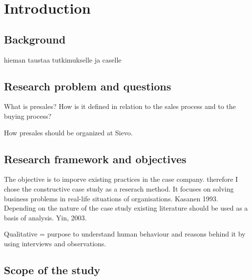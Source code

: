 \documentclass[12pt,a4paper,oneside,pdftex]{report}
\begin{document}
\pagestyle{headings}


% 

\chapter{Introduction}
\label{chapter:intro}






\section{Background}

hieman taustaa tutkimukselle ja caselle

\section{Research problem and questions}
\label{section:constructive}

What is presales? How is it defined in relation to the sales process and to the buying process?

How presales should be organized at Sievo. 

\section{Research framework and objectives}
\label{section:structure}

The objective is to imporve existing practices in the case company. therefore I chose the constructive case study as a reserach method. It focuses on solving business problems in real-life situations of organisations. Kasanen 1993. Depending on the nature of the case study existing literature should be used as a basis of analysis. Yin, 2003. 

Qualitative = purpose to understand human behaviour and reasons behind it by using interviews and observations. 

\section{Scope of the study}
\label{section:structure}
\end{document}
